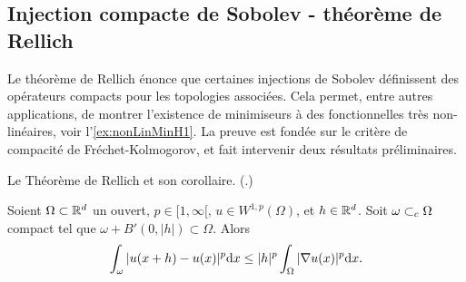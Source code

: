 \subsection{Injection compacte de Sobolev - théorème de Rellich}
\label{subsec:injCompacte}

Le théorème de Rellich énonce que certaines injections de Sobolev définissent des opérateurs compacts pour les topologies associées. Cela permet, entre autres applications, de montrer l'existence de minimiseurs à des fonctionnelles très non-linéaires, voir l'\cref{ex:nonLinMinH1}.
La preuve est fondée sur le critère de compacité de Fréchet-Kolmogorov, et fait intervenir deux résultats préliminaires. %

\begin{retenir}
Le Théorème de Rellich et son corollaire.
(.)
\end{retenir}


\begin{proposition}
\label{prop:trans_grad_lp}
%
Soient $\Omega\subset \mathbb{R}^d$ un ouvert, $p\in [1,\infty[$, $u \in W^{1,p}(\Omega)$, et $h\in \mathbb{R}^d$.
Soit $\omega \subset_c \Omega$ compact tel que $\omega+B'(0,|h|) \subset \Omega$. Alors 
	\begin{equation}
	\label{eq:uhdup}
		\int_\omega |u(x+h)-u(x)|^p \mathrm{d} x \leq |h|^p \int_\Omega |\nabla u(x)|^p \mathrm{d} x.
	\end{equation}
\end{proposition}

